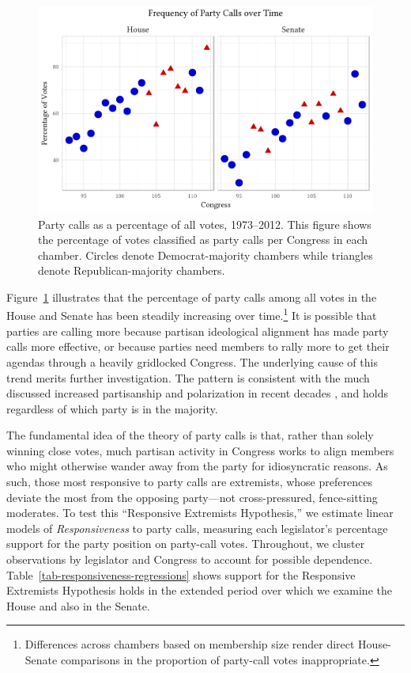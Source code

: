 \documentclass[12pt]{article}
\begin{document}
\begin{figure}[t]
\centering
\includegraphics{party-calls-over-time}
\caption{
  Party calls as a percentage of all votes, 1973--2012.
  This figure shows the percentage of votes classified as party calls per
  Congress in each chamber.
  Circles denote Democrat-majority chambers while triangles denote
  Republican-majority chambers.
  \label{fig-party-calls-over-time}}
\end{figure}

Figure~\ref{fig-party-calls-over-time} illustrates that the percentage of party
calls among all votes in the House and Senate has been steadily increasing over
time.\footnote{
  \doublespacing\normalsize
  Differences across chambers based on membership size render
  direct House-Senate comparisons in the proportion of party-call votes
  inappropriate.}
It is possible that parties are calling more because partisan ideological
alignment has made party calls more effective, or because parties need members
to rally more to get their agendas through a heavily gridlocked Congress.
The underlying cause of this trend merits further investigation.
The pattern is consistent with the much discussed increased partisanship and
polarization in recent decades \citep[e.g.,][]{Aldrich:2000, Lee:2009, Lee:2016,
Theriault:2013, Smith:2014}, and holds regardless of which party is in the
majority.

The fundamental idea of the theory of party calls is that, rather than solely
winning close votes, much partisan activity in Congress works to align members
who might otherwise wander away from the party for idiosyncratic reasons.
As such, those most responsive to party calls are extremists, whose preferences
deviate the most from the opposing party---not cross-pressured, fence-sitting
moderates.
To test this ``Responsive Extremists Hypothesis,'' we estimate linear models of
\textit{Responsiveness} to party calls, measuring each legislator's percentage
support for the party position on party-call votes.
Throughout, we cluster observations by legislator and Congress to account for
possible dependence.
Table~\ref{tab-responsiveness-regressions} shows support for the Responsive
Extremists Hypothesis holds in the extended period over which we examine the
House and also in the Senate.
\end{document}
